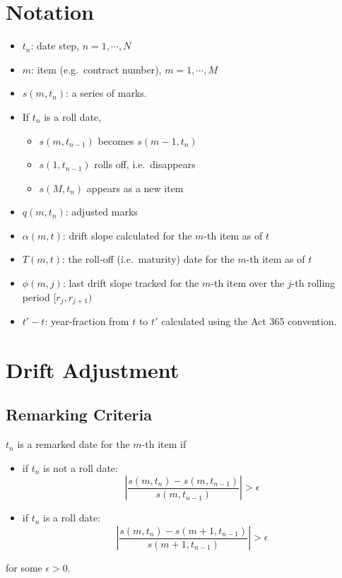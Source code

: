 \documentclass[12pt]{article}
\begin{document}
\section{Notation}
\begin{itemize}
    \item $t_n$: date step, $n = 1, \cdots, N$
    \item $m$: item (e.g.\ contract number), $m = 1, \cdots, M$
    \item $s(m,t_n)$: a series of marks. 
    \item If $t_{n}$ is a roll date, 
    \begin{itemize}
        \item $s(m,t_{n-1})$ becomes $s(m-1, t_n)$
        \item $s(1,t_{n-1})$ rolls off, i.e.\ disappears
        \item $s(M, t_{n})$ appears as a new item
    \end{itemize}
    \item $q(m,t_n)$: adjusted marks
    \item $\alpha(m, t)$: drift slope calculated for the $m$-th item as of $t$
    \item $T(m,t)$: the roll-off (i.e.\ maturity) date for the $m$-th item as of $t$
    \item $\phi(m,j)$: last drift slope tracked for the $m$-th item over the $j$-th rolling period $[r_j, r_{j+1})$
    \item $t' - t$: year-fraction from $t$ to $t'$ calculated using the Act 365 convention. 

\end{itemize}

\section{Drift Adjustment}

\subsection{Remarking Criteria}

$t_n$ is a remarked date for the $m$-th item if
\begin{itemize}
    \item if $t_n$ is not a roll date: 
    \begin{equation}
        \left|\frac{s(m, t_n) - s(m, t_{n-1})}{s(m, t_{n-1})} \right| > \epsilon 
    \end{equation}
    \item if $t_n$ is a roll date:
    \begin{equation}
        \left|\frac{s(m, t_n) - s(m + 1, t_{n-1})}{s(m + 1, t_{n-1})} \right| > \epsilon 
    \end{equation}
\end{itemize}
for some $\epsilon > 0$. 
\end{document}
